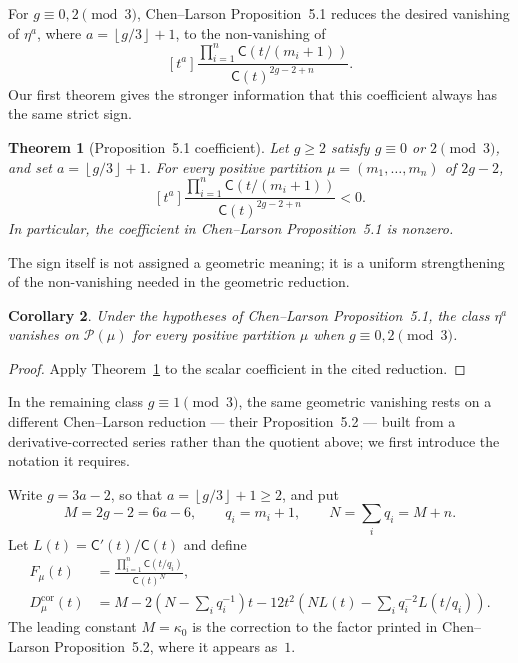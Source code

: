 \documentclass[11pt]{article}
\newtheorem{theorem}{Theorem}[section]
\newtheorem{corollary}[theorem]{Corollary}
\theoremstyle{definition}
\theoremstyle{remark}
\newcommand{\C}{\mathsf C}
\newcommand{\floor}[1]{\left\lfloor #1\right\rfloor}
\begin{document}
For $g\equiv0,2\pmod3$, Chen--Larson Proposition~5.1 reduces the desired
vanishing of $\eta^a$, where $a=\floor{g/3}+1$, to the non-vanishing of
\[
  [t^a]\frac{\prod_{i=1}^n\C(t/(m_i+1))}{\C(t)^{2g-2+n}}.
\]
Our first theorem gives the stronger information that this coefficient always
has the same strict sign.

\begin{theorem}[Proposition~5.1 coefficient]\label{thm:main}
Let $g\ge2$ satisfy $g\equiv0$ or $2\pmod3$, and set
$a=\floor{g/3}+1$.  For every positive partition
$\mu=(m_1,\ldots,m_n)$ of $2g-2$,
\begin{equation}\label{eq:main-neg}
  [t^a]\frac{\prod_{i=1}^n\C(t/(m_i+1))}
                   {\C(t)^{2g-2+n}}<0.
\end{equation}
In particular, the coefficient in Chen--Larson Proposition~5.1 is nonzero.
\end{theorem}

The sign itself is not assigned a geometric meaning; it is a uniform
strengthening of the non-vanishing needed in the geometric reduction.

\begin{corollary}\label{cor:geometric}
Under the hypotheses of Chen--Larson Proposition~5.1, the class $\eta^a$
vanishes on $\mathcal P(\mu)$ for every positive partition $\mu$ when
$g\equiv0,2\pmod3$.
\end{corollary}

\begin{proof}
Apply Theorem~\ref{thm:main} to the scalar coefficient in the cited reduction.
\end{proof}

In the remaining class $g\equiv1\pmod3$, the same geometric vanishing rests on a
different Chen--Larson reduction --- their Proposition~5.2 --- built from a
derivative-corrected series rather than the quotient above; we first introduce
the notation it requires.

Write $g=3a-2$, so that
$a=\floor{g/3}+1\ge2$, and put
\[
  M=2g-2=6a-6,
  \qquad q_i=m_i+1,
  \qquad N=\sum_iq_i=M+n.
\]
Let $L(t)=\C'(t)/\C(t)$ and define
\begin{align}
 F_\mu(t)&=\frac{\prod_{i=1}^n\C(t/q_i)}{\C(t)^N},
 \label{eq:Fmu-intro}\\
 D_\mu^{\mathrm{cor}}(t)
 &=M-2\left(N-\sum_iq_i^{-1}\right)t
   -12t^2\left(NL(t)-\sum_iq_i^{-2}L(t/q_i)\right).
 \label{eq:Dcor-intro}
\end{align}
The leading constant $M=\kappa_0$ is the correction to the factor printed in
Chen--Larson Proposition~5.2, where it appears as~$1$.
\end{document}
